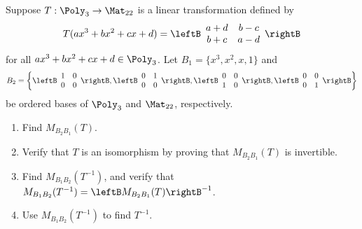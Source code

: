 \begin{example}{}{}
Suppose $T:\Poly_3\to\Mat_{22}$ is a linear transformation
defined by
\[ T(ax^3+bx^2+cx+d)=
\leftB\begin{array}{cc} a+d & b-c \\ b+c & a-d \end{array}\rightB\]
for all $ax^3+bx^2+cx+d\in\Poly_3$. Let
$B_1=\{ x^3, x^2, x, 1\}$ and
\[ B_2=\left\{
\leftB\begin{array}{cc} 1 & 0 \\ 0 & 0 \end{array}\rightB,
\leftB\begin{array}{cc} 0 & 1 \\ 0 & 0 \end{array}\rightB,
\leftB\begin{array}{cc} 0 & 0 \\ 1 & 0 \end{array}\rightB,
\leftB\begin{array}{cc} 0 & 0 \\ 0 & 1 \end{array}\rightB\right\}\]
be ordered bases of $\Poly_3$ and $\Mat_{22}$, respectively.
\begin{enumerate}
\item Find $M_{B_2B_1}(T)$.
\item Verify that $T$ is an isomorphism by proving that $M_{B_2B_1}(T)$
is invertible.
\item Find $M_{B_1B_2}(T^{-1})$, and verify that 
$M_{B_1B_2}(T^{-1}) = \leftB M_{B_2B_1}(T)\rightB^{-1}$.
\item Use $M_{B_1B_2}(T^{-1})$ to find $T^{-1}$.
\end{enumerate}
\end{example}

